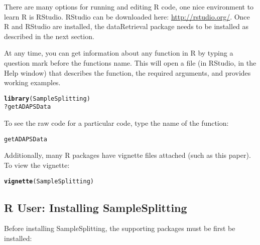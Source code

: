 \documentclass[a4paper,11pt]{article}\usepackage[]{graphicx}\usepackage[]{color}
\makeatletter
\newcommand{\hlopt}[1]{\textcolor[rgb]{0,0,0}{#1}}%
\newcommand{\hlstd}[1]{\textcolor[rgb]{0.345,0.345,0.345}{#1}}%
\newcommand{\hlkwd}[1]{\textcolor[rgb]{0.737,0.353,0.396}{\textbf{#1}}}%
\newenvironment{kframe}{%
 \def\at@end@of@kframe{}%
 \ifinner\ifhmode%
  \def\at@end@of@kframe{\end{minipage}}%
  \begin{minipage}{\columnwidth}%
 \fi\fi%
 \def\FrameCommand##1{\hskip\@totalleftmargin \hskip-\fboxsep
 \colorbox{shadecolor}{##1}\hskip-\fboxsep
     \hskip-\linewidth \hskip-\@totalleftmargin \hskip\columnwidth}%
 \MakeFramed {\advance\hsize-\width
   \@totalleftmargin\z@ \linewidth\hsize
   \@setminipage}}%
 {\par\unskip\endMakeFramed%
 \at@end@of@kframe}
\newenvironment{knitrout}{}{} %
\makeatother
\begin{document}
There are many options for running and editing R code, one nice environment to learn R is RStudio. RStudio can be downloaded here: \url{http://rstudio.org/}. Once R and RStudio are installed, the dataRetrieval package needs to be installed as described in the next section.

At any time, you can get information about any function in R by typing a question mark before the functions name.  This will open a file (in RStudio, in the Help window) that describes the function, the required arguments, and provides working examples.

\begin{knitrout}
\color{fgcolor}\begin{kframe}
\begin{alltt}
\hlkwd{library}\hlstd{(SampleSplitting)}
\hlopt{?}\hlstd{getADAPSData}
\end{alltt}
\end{kframe}
\end{knitrout}

To see the raw code for a particular code, type the name of the function:
\begin{knitrout}
\color{fgcolor}\begin{kframe}
\begin{alltt}
\hlstd{getADAPSData}
\end{alltt}
\end{kframe}
\end{knitrout}

Additionally, many R packages have vignette files attached (such as this paper). To view the vignette:
\begin{knitrout}
\color{fgcolor}\begin{kframe}
\begin{alltt}
\hlkwd{vignette}\hlstd{(SampleSplitting)}
\end{alltt}
\end{kframe}
\end{knitrout}

\FloatBarrier
\clearpage
\subsection{R User: Installing SampleSplitting}
Before installing SampleSplitting, the supporting packages must be first be installed:
\end{document}
